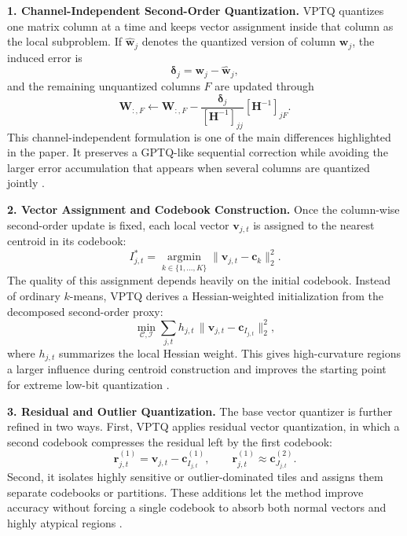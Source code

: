\textbf{1. Channel-Independent Second-Order Quantization.} VPTQ quantizes one matrix column at a time and keeps vector assignment inside that column as the local subproblem. If $\hat{\bm{w}}_j$ denotes the quantized version of column $\bm{w}_j$, the induced error is
\begin{equation}
\bm{\delta}_j = \bm{w}_j - \hat{\bm{w}}_j,
\end{equation}
and the remaining unquantized columns $F$ are updated through
\begin{equation}
\bm{W}_{:,F} \leftarrow \bm{W}_{:,F} - \frac{\bm{\delta}_j}{[\bm{H}^{-1}]_{jj}}[\bm{H}^{-1}]_{jF}.
\end{equation}
This channel-independent formulation is one of the main differences highlighted in the paper. It preserves a GPTQ-like sequential correction while avoiding the larger error accumulation that appears when several columns are quantized jointly \cite{liu2024vptq}.

\textbf{2. Vector Assignment and Codebook Construction.} Once the column-wise second-order update is fixed, each local vector $\bm{v}_{j,t}$ is assigned to the nearest centroid in its codebook:
\begin{equation}
I_{j,t}^{*} = \operatorname*{argmin}_{k \in \{1,\dots,K\}} \|\bm{v}_{j,t} - \bm{c}_{k}\|_2^2.
\end{equation}
The quality of this assignment depends heavily on the initial codebook. Instead of ordinary $k$-means, VPTQ derives a Hessian-weighted initialization from the decomposed second-order proxy:
\begin{equation}
\min_{\mathcal{C},\mathcal{I}} \sum_{j,t} h_{j,t}\,\|\bm{v}_{j,t} - \bm{c}_{I_{j,t}}\|_2^2,
\end{equation}
where $h_{j,t}$ summarizes the local Hessian weight. This gives high-curvature regions a larger influence during centroid construction and improves the starting point for extreme low-bit quantization \cite{liu2024vptq}.

\textbf{3. Residual and Outlier Quantization.} The base vector quantizer is further refined in two ways. First, VPTQ applies residual vector quantization, in which a second codebook compresses the residual left by the first codebook:
\begin{equation}
\bm{r}_{j,t}^{(1)} = \bm{v}_{j,t} - \bm{c}^{(1)}_{I_{j,t}}, \qquad
\bm{r}_{j,t}^{(1)} \approx \bm{c}^{(2)}_{J_{j,t}}.
\end{equation}
Second, it isolates highly sensitive or outlier-dominated tiles and assigns them separate codebooks or partitions. These additions let the method improve accuracy without forcing a single codebook to absorb both normal vectors and highly atypical regions \cite{liu2024vptq}.

